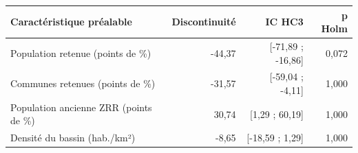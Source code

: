 \begin{tabularx}{\linewidth}{Xrrr}
\toprule
Caractéristique préalable & Discontinuité & IC HC3 & p Holm \\
\midrule
Population retenue (points de \%) & -44,37 & [-71,89 ; -16,86] & 0,072 \\
Communes retenues (points de \%) & -31,57 & [-59,04 ; -4,11] & 1,000 \\
Population ancienne ZRR (points de \%) & 30,74 & [1,29 ; 60,19] & 1,000 \\
Densité du bassin (hab./km²) & -8,65 & [-18,59 ; 1,29] & 1,000 \\
\bottomrule
\end{tabularx}
